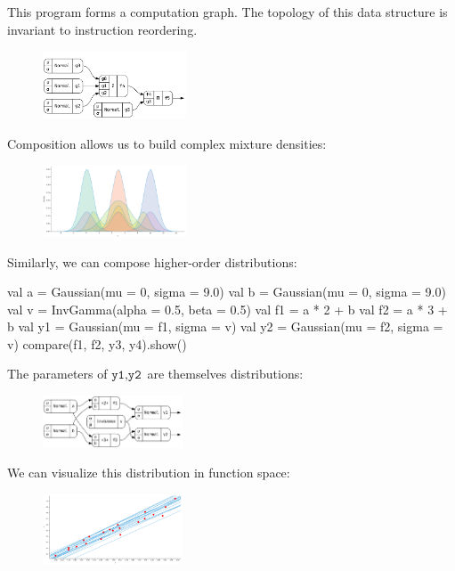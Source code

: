 \documentclass{article}
\begin{document}
This program forms a computation graph. The topology of this data structure is invariant to instruction reordering.

\begin{figure}[H]
\centering
\includegraphics[width=0.38\textwidth]{bayesR.png}
\end{figure}

Composition allows us to build complex mixture densities:

\begin{figure}[h]
\centering
\includegraphics[width=0.38\textwidth]{plot.png}
\end{figure}

Similarly, we can compose higher-order distributions:

\begin{kotlinlisting}
val a = Gaussian(mu = 0, sigma = 9.0)
val b = Gaussian(mu = 0, sigma = 9.0)
val v = InvGamma(alpha = 0.5, beta = 0.5)
val f1 = a * 2 + b
val f2 = a * 3 + b
val y1 = Gaussian(mu = f1, sigma = v)
val y2 = Gaussian(mu = f2, sigma = v)
compare(f1, f2, y3, y4).show()
\end{kotlinlisting}

The parameters of $\texttt{y1}, \texttt{y2}$ are themselves distributions:

\begin{figure}[H]\centering
\includegraphics[width=0.37\textwidth]{bayesLR.png}
\end{figure}

We can visualize this distribution in function space:

\begin{figure}[h]\centering
\includegraphics[width=0.37\textwidth]{bayesLR_plot.png}
\end{figure}
\end{document}
